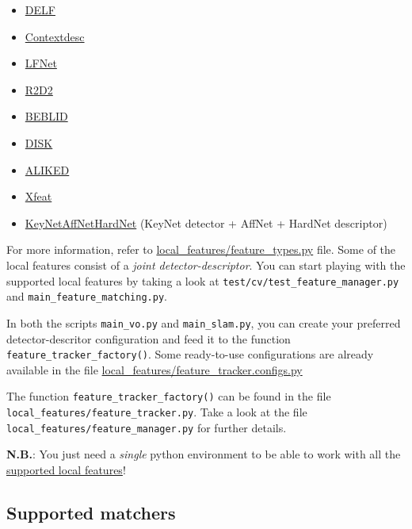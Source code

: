 \documentclass{article}
\begin{document}
\begin{itemize}
    \item \href{https://github.com/tensorflow/models/tree/master/research/delf}{DELF} \cite{noh2017large}
    \item \href{https://github.com/lzx551402/contextdesc}{Contextdesc} \cite{luo2020contextdesc}
    \item \href{https://github.com/vcg-uvic/lf-net-release}{LFNet} \cite{ono2018lf}
    \item \href{https://github.com/naver/r2d2}{R2D2} \cite{revaud2019r2d2}
    \item \href{https://raw.githubusercontent.com/iago-suarez/BEBLID/master/BEBLID_Boosted_Efficient_Binary_Local_Image_Descriptor.pdf}{BEBLID}
    \item \href{https://arxiv.org/abs/2006.13566}{DISK} \cite{tyszkiewicz2020disk}
    \item \href{https://arxiv.org/abs/2304.03608}{ALIKED} \cite{barroso2023alike}
    \item \href{https://arxiv.org/abs/2404.19174}{Xfeat} \cite{barroso2024xfeat}
    \item \href{https://github.com/axelBarroso/Key.Net}{KeyNetAffNetHardNet} (KeyNet detector + AffNet + HardNet descriptor)
\end{itemize}

For more information, refer to \url{local_features/feature_types.py}
file. Some of the local features consist of a \emph{joint
detector-descriptor}. You can start playing with the supported local
features by taking a look at \texttt{test/cv/test\_feature\_manager.py}
and \texttt{main\_feature\_matching.py}.

In both the scripts \texttt{main\_vo.py} and \texttt{main\_slam.py}, you
can create your preferred detector-descritor configuration and feed it
to the function \texttt{feature\_tracker\_factory()}. Some ready-to-use
configurations are already available in the file
\href{local_features/feature_tracker_configs.py}{local\_features/feature\_tracker.configs.py}

The function \texttt{feature\_tracker\_factory()} can be found in the
file \texttt{local\_features/feature\_tracker.py}. Take a look at the
file \texttt{local\_features/feature\_manager.py} for further details.

\textbf{N.B.}: You just need a \emph{single} python environment to be
able to work with all the
\protect\hyperlink{supported-local-features}{supported local features}!

\hypertarget{supported-matchers}{%
\subsection{Supported matchers}\label{supported-matchers}}
\end{document}
